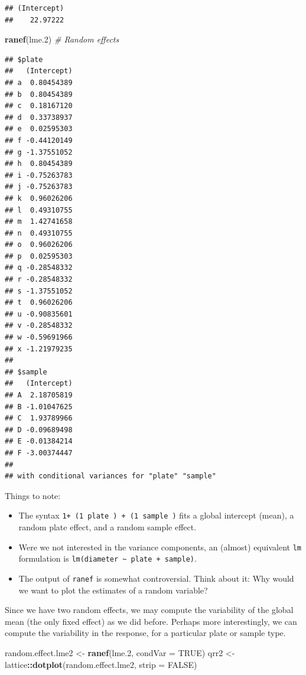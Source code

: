 \documentclass[]{book}
\newenvironment{Shaded}{\begin{snugshade}}{\end{snugshade}}
\newcommand{\KeywordTok}[1]{\textcolor[rgb]{0.13,0.29,0.53}{\textbf{#1}}}
\newcommand{\DataTypeTok}[1]{\textcolor[rgb]{0.13,0.29,0.53}{#1}}
\newcommand{\DecValTok}[1]{\textcolor[rgb]{0.00,0.00,0.81}{#1}}
\newcommand{\StringTok}[1]{\textcolor[rgb]{0.31,0.60,0.02}{#1}}
\newcommand{\CommentTok}[1]{\textcolor[rgb]{0.56,0.35,0.01}{\textit{#1}}}
\newcommand{\OtherTok}[1]{\textcolor[rgb]{0.56,0.35,0.01}{#1}}
\newcommand{\OperatorTok}[1]{\textcolor[rgb]{0.81,0.36,0.00}{\textbf{#1}}}
\newcommand{\NormalTok}[1]{#1}
\providecommand{\tightlist}{%
  \setlength{\itemsep}{0pt}\setlength{\parskip}{0pt}}
\theoremstyle{definition}
\theoremstyle{definition}
\theoremstyle{definition}
\theoremstyle{remark}
\begin{document}
\begin{verbatim}
## (Intercept) 
##    22.97222
\end{verbatim}

\begin{Shaded}
\begin{Highlighting}[]
\KeywordTok{ranef}\NormalTok{(lme.}\DecValTok{2}\NormalTok{) }\CommentTok{# Random effects}
\end{Highlighting}
\end{Shaded}

\begin{verbatim}
## $plate
##   (Intercept)
## a  0.80454389
## b  0.80454389
## c  0.18167120
## d  0.33738937
## e  0.02595303
## f -0.44120149
## g -1.37551052
## h  0.80454389
## i -0.75263783
## j -0.75263783
## k  0.96026206
## l  0.49310755
## m  1.42741658
## n  0.49310755
## o  0.96026206
## p  0.02595303
## q -0.28548332
## r -0.28548332
## s -1.37551052
## t  0.96026206
## u -0.90835601
## v -0.28548332
## w -0.59691966
## x -1.21979235
## 
## $sample
##   (Intercept)
## A  2.18705819
## B -1.01047625
## C  1.93789966
## D -0.09689498
## E -0.01384214
## F -3.00374447
## 
## with conditional variances for "plate" "sample"
\end{verbatim}

Things to note:

\begin{itemize}
\tightlist
\item
  The syntax
  \texttt{1+\ (1\textbar{}\ plate\ )\ +\ (1\textbar{}\ sample\ )} fits a
  global intercept (mean), a random plate effect, and a random sample
  effect.
\item
  Were we not interested in the variance components, an (almost)
  equivalent \texttt{lm} formulation is
  \texttt{lm(diameter\ \textasciitilde{}\ plate\ +\ sample)}.
\item
  The output of \texttt{ranef} is somewhat controversial. Think about
  it: Why would we want to plot the estimates of a random variable?
\end{itemize}

Since we have two random effects, we may compute the variability of the
global mean (the only fixed effect) as we did before. Perhaps more
interestingly, we can compute the variability in the response, for a
particular plate or sample type.

\begin{Shaded}
\begin{Highlighting}[]
\NormalTok{random.effect.lme2 <-}\StringTok{ }\KeywordTok{ranef}\NormalTok{(lme.}\DecValTok{2}\NormalTok{, }\DataTypeTok{condVar =} \OtherTok{TRUE}\NormalTok{) }
\NormalTok{qrr2 <-}\StringTok{ }\NormalTok{lattice}\OperatorTok{::}\KeywordTok{dotplot}\NormalTok{(random.effect.lme2, }\DataTypeTok{strip =} \OtherTok{FALSE}\NormalTok{)}
\end{Highlighting}
\end{Shaded}
\end{document}
